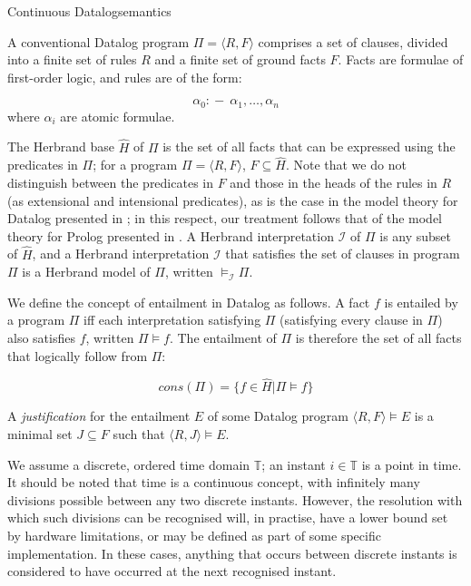 \begin{nestedsection}{Continuous Datalog}{semantics}
\begin{definition}[Datalog]
A conventional Datalog program $\Pi = \langle R, F\rangle$ comprises a
set of clauses, divided into a finite set of rules $R$ and a finite
set of ground facts $F$. Facts are formulae of first-order logic, and
rules are of the form:

\[\alpha_0 :\!-\ \alpha_1 , \ldots , \alpha_n\]
where $\alpha_i$ are atomic formulae.

The Herbrand base $\hat{H}$ of $\Pi$ is the set of all facts that can
be expressed using the predicates in $\Pi$; for a program $\Pi =
\langle R, F \rangle$, $F \subseteq \hat{H}$. Note that we do not
distinguish between the predicates in $F$ and those in the heads of
the rules in $R$ (as extensional and intensional predicates), as is
the case in the model theory for Datalog presented in
\cite{datalog-basics}; in this respect, our treatment follows that of
the model theory for Prolog presented in \cite{prolog-semantics}. A
Herbrand interpretation $\mathcal{I}$ of $\Pi$ is any subset of
$\hat{H}$, and a Herbrand interpretation $\mathcal{I}$ that satisfies
the set of clauses in program $\Pi$ is a Herbrand model of $\Pi$,
written $\models_{\mathcal{I}} \Pi$.

We define the concept of entailment in Datalog as follows. A fact $f$
is entailed by a program $\Pi$ iff each interpretation satisfying
$\Pi$ (satisfying every clause in $\Pi$) also satisfies $f$, written
$\Pi \models f$. The entailment of $\Pi$ is therefore the set of all
facts that logically follow from $\Pi$:

\[cons(\Pi) = \{ f \in \hat{H} | \Pi \models f \}\]
\end{definition}

\begin{definition}[Justification]
A {\em justification} for the entailment $E$ of some Datalog program
${\langle R , F \rangle \models E}$ is a minimal set
${J \subseteq F}$ such that ${\langle R , J \rangle \models E}$.
\end{definition}

\begin{definition}[Instant]
We assume a discrete, ordered time domain $\mathbb{T}$; an instant $i
\in \mathbb{T}$ is a point in time. It should be noted that time is a
continuous concept, with infinitely many divisions possible between
any two discrete instants.  However, the resolution with which such
divisions can be recognised will, in practise, have a lower bound set
by hardware limitations, or may be defined as part of some specific
implementation.  In these cases, anything that occurs between discrete
instants is considered to have occurred at the next recognised
instant.
\end{definition}


\end{nestedsection}
